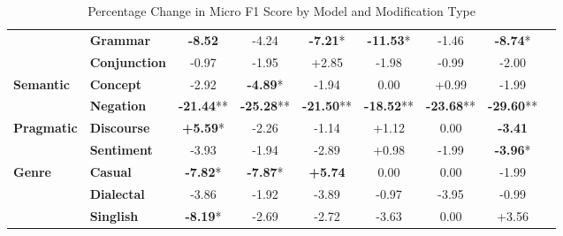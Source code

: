 \begin{table}[h]
\begin{adjustbox}{max width=\linewidth}
\begin{tabular}{llccccccc}
 & \textbf{Grammar} & \cellcolor{red!25} \textbf{-8.52} & \cellcolor{red!12} -4.24 & \cellcolor{red!21} \textbf{-7.21}* & \cellcolor{red!30} \textbf{-11.53}* & \cellcolor{red!4} -1.46 & \cellcolor{red!26} \textbf{-8.74}* \\
 & \textbf{Conjunction} & \cellcolor{red!2} -0.97 & \cellcolor{red!5} -1.95 & \cellcolor{green!8} +2.85 & \cellcolor{red!5} -1.98 & \cellcolor{red!2} -0.99 & \cellcolor{red!5} -2.00 \\
\hline
\textbf{Semantic} & \textbf{Concept} & \cellcolor{red!8} -2.92 & \cellcolor{red!14} \textbf{-4.89}* & \cellcolor{red!5} -1.94 & \cellcolor{red!0} 0.00 & \cellcolor{green!2} +0.99 & \cellcolor{red!5} -1.99 \\
 & \textbf{Negation} & \cellcolor{red!30} \textbf{-21.44}** & \cellcolor{red!30} \textbf{-25.28}** & \cellcolor{red!30} \textbf{-21.50}** & \cellcolor{red!30} \textbf{-18.52}** & \cellcolor{red!30} \textbf{-23.68}** & \cellcolor{red!30} \textbf{-29.60}** \\
\hline
\textbf{Pragmatic} & \textbf{Discourse} & \cellcolor{green!16} \textbf{+5.59}* & \cellcolor{red!6} -2.26 & \cellcolor{red!3} -1.14 & \cellcolor{green!3} +1.12 & \cellcolor{red!0} 0.00 & \cellcolor{red!10} \textbf{-3.41} \\
 & \textbf{Sentiment} & \cellcolor{red!11} -3.93 & \cellcolor{red!5} -1.94 & \cellcolor{red!8} -2.89 & \cellcolor{green!2} +0.98 & \cellcolor{red!5} -1.99 & \cellcolor{red!11} \textbf{-3.96}* \\
\hline
\textbf{Genre} & \textbf{Casual} & \cellcolor{red!23} \textbf{-7.82}* & \cellcolor{red!23} \textbf{-7.87}* & \cellcolor{green!17} \textbf{+5.74} & \cellcolor{red!0} 0.00 & \cellcolor{red!0} 0.00 & \cellcolor{red!5} -1.99 \\
 & \textbf{Dialectal} & \cellcolor{red!11} -3.86 & \cellcolor{red!5} -1.92 & \cellcolor{red!11} -3.89 & \cellcolor{red!2} -0.97 & \cellcolor{red!11} -3.95 & \cellcolor{red!2} -0.99 \\
 & \textbf{Singlish} & \cellcolor{red!24} \textbf{-8.19}* & \cellcolor{red!8} -2.69 & \cellcolor{red!8} -2.72 & \cellcolor{red!10} -3.63 & \cellcolor{red!0} 0.00 & \cellcolor{green!10} +3.56 \\
\hline
\end{tabular}
\end{adjustbox}
\caption{Percentage Change in Micro F1 Score by Model and Modification Type}
\label{tab:dialogue_results_table}
\end{table}
